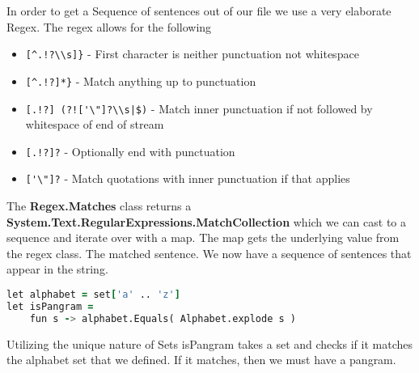 In order to get a Sequence of sentences out of our file we use a very elaborate Regex. The regex allows for the following
\begin{itemize}
  \item \verb+[^.!?\\s]}+ - First character is neither punctuation not whitespace
  \item \verb+[^.!?]*}+ - Match anything up to punctuation
  \item \verb+[.!?] (?!['\"]?\\s|$)+ - Match inner punctuation if not followed by whitespace of end of stream
  \item \verb+[.!?]?+ - Optionally end with punctuation
  \item \verb+['\"]?+ - Match quotations with inner punctuation if that applies
\end{itemize}

The \textbf{Regex.Matches} class returns a \textbf{System.Text.RegularExpressions.MatchCollection} which we can cast to a sequence and iterate over with a map.
The map gets the underlying value from the regex class. The matched sentence. We now have a sequence of sentences that appear in the string.

\begin{lstlisting}[language=F]
let alphabet = set['a' .. 'z']
let isPangram =
    fun s -> alphabet.Equals( Alphabet.explode s )
\end{lstlisting}

Utilizing the unique nature of Sets isPangram takes a set and checks if it matches the alphabet set that we defined. If it matches, then we must have a pangram.

